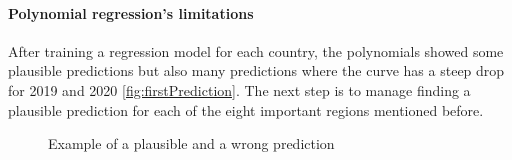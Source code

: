 \paragraph*{Polynomial regression's limitations}
After training a regression model for each country, the polynomials showed some plausible predictions but also many predictions where the curve has a steep drop for 2019 and 2020 \autoref{fig:firstPrediction}. The next step is to manage finding a plausible prediction for each of the eight important regions mentioned before.

\begin{figure}[h!]
	\centering
	\caption{Example of a plausible and a wrong prediction}
	\label{fig:firstPrediction}
\end{figure}

